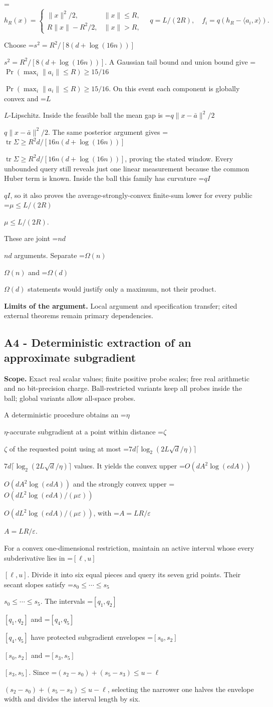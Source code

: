 \documentclass[10pt,a4paper]{article}
\newcommand{\AtlasMath}[1]{\par\begingroup\centering\setbox0=\hbox{$\displaystyle #1$}\ifdim\wd0>1.4\linewidth\typeout{ATLAS WIDE FORMULA: \the\wd0}\fi\ifdim\wd0>\linewidth\resizebox{\linewidth}{!}{\box0}\else\box0\fi\par\endgroup}
\newcommand{\AtlasInlineMath}[1]{\begingroup\setbox0=\hbox{$#1$}\ifdim\wd0>.4\linewidth\endgroup\AtlasMath{#1}\else\endgroup$#1$\fi}
\begin{document}
\AtlasMath{h_R(x)=\begin{cases}\|x\|^2/2,&\|x\|\le R,\\R\|x\|-R^2/2,&\|x\|>R,\end{cases}\quad q=L/(2R),\quad f_i=q(h_R-\langle a_i,x\rangle).}

Choose \AtlasInlineMath{s^2=R^2/[8(d+\log(16n))]}. A Gaussian tail bound and union bound give \AtlasInlineMath{\Pr(\max_i\|a_i\|\le R)\ge15/16}. On this event each component is globally convex and \AtlasInlineMath{L}-Lipschitz. Inside the feasible ball the mean gap is \AtlasInlineMath{q\|x-\bar a\|^2/2}. The same posterior argument gives \AtlasInlineMath{\operatorname{tr}\Sigma\ge R^2d/[16n(d+\log(16n))]}, proving the stated window. Every unbounded query still reveals just one linear measurement because the common Huber term is known. Inside the ball this family has curvature \AtlasInlineMath{qI}, so it also proves the average-strongly-convex finite-sum lower for every public \AtlasInlineMath{\mu\le L/(2R)}.

These are joint \AtlasInlineMath{nd} arguments. Separate \AtlasInlineMath{\Omega(n)} and \AtlasInlineMath{\Omega(d)} statements would justify only a maximum, not their product.

\textbf{Limits of the argument.} Local argument and specification transfer; cited external theorems remain primary dependencies.

\subsection{A4 - Deterministic extraction of an approximate subgradient}
\textbf{Scope.} Exact real scalar values; finite positive probe scales; free real arithmetic and no bit-precision charge. Ball-restricted variants keep all probes inside the ball; global variants allow all-space probes.

A deterministic procedure obtains an \AtlasInlineMath{\eta}-accurate subgradient at a point within distance \AtlasInlineMath{\zeta} of the requested point using at most \AtlasInlineMath{7d\lceil\log_2(2L\sqrt d/\eta)\rceil} values. It yields the convex upper \AtlasInlineMath{O(dA^2\log(edA))} and the strongly convex upper \AtlasInlineMath{O(dL^2\log(edA)/(\mu\varepsilon))}, with \AtlasInlineMath{A=LR/\varepsilon}.

For a convex one-dimensional restriction, maintain an active interval whose every subderivative lies in \AtlasInlineMath{[\ell,u]}. Divide it into six equal pieces and query its seven grid points. Their secant slopes satisfy \AtlasInlineMath{s_0\le\cdots\le s_5}. The intervals \AtlasInlineMath{[q_1,q_2]} and \AtlasInlineMath{[q_4,q_5]} have protected subgradient envelopes \AtlasInlineMath{[s_0,s_2]} and \AtlasInlineMath{[s_3,s_5]}. Since \AtlasInlineMath{(s_2-s_0)+(s_5-s_3)\le u-\ell}, selecting the narrower one halves the envelope width and divides the interval length by six.
\end{document}
